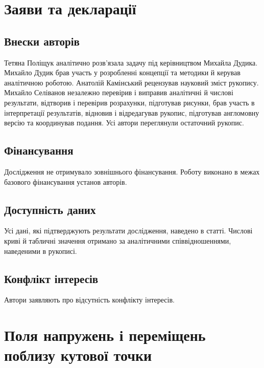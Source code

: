 \section*{Заяви та декларації}
\subsection*{Внески авторів}
Тетяна Поліщук аналітично розв’язала задачу під керівництвом Михайла Дудика. Михайло Дудик брав участь у розробленні концепції та методики й керував аналітичною роботою. Анатолій Камінський рецензував науковий зміст рукопису. Михайло Селіванов незалежно перевірив і виправив аналітичні й числові результати, відтворив і перевірив розрахунки, підготував рисунки, брав участь в інтерпретації результатів, відновив і відредагував рукопис, підготував англомовну версію та координував подання. Усі автори переглянули остаточний рукопис.

\subsection*{Фінансування}
Дослідження не отримувало зовнішнього фінансування. Роботу виконано в межах базового фінансування установ авторів.

\subsection*{Доступність даних}
Усі дані, які підтверджують результати дослідження, наведено в статті. Числові криві й табличні значення отримано за аналітичними співвідношеннями, наведеними в рукописі.

\subsection*{Конфлікт інтересів}
Автори заявляють про відсутність конфлікту інтересів.

\appendix
\renewcommand{\theHequation}{appendix.\arabic{equation}}
\section{Поля напружень і переміщень поблизу кутової точки}
\label{app:asymptotics}
\providecommand{\SingularityExponentFigure}{рис.~\ref{fig:singularity-exponents}}

\setcounter{equation}{0}
\renewcommand{\theequation}{A.\arabic{equation}}


